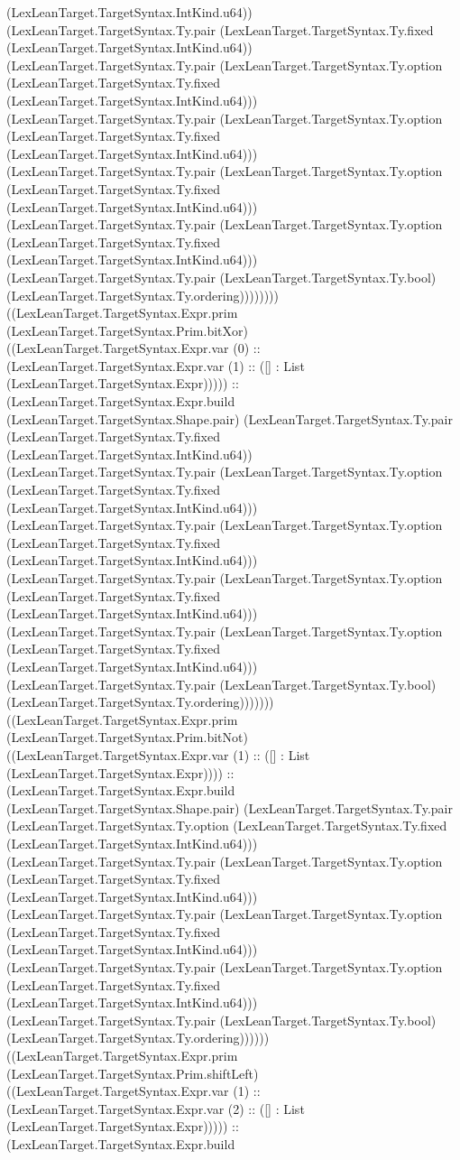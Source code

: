 \documentclass[11pt]{article}
\begin{document}
(LexLeanTarget.TargetSyntax.IntKind.u64)) (LexLeanTarget.TargetSyntax.Ty.pair (LexLeanTarget.TargetSyntax.Ty.fixed (LexLeanTarget.TargetSyntax.IntKind.u64)) (LexLeanTarget.TargetSyntax.Ty.pair (LexLeanTarget.TargetSyntax.Ty.option (LexLeanTarget.TargetSyntax.Ty.fixed (LexLeanTarget.TargetSyntax.IntKind.u64))) (LexLeanTarget.TargetSyntax.Ty.pair (LexLeanTarget.TargetSyntax.Ty.option (LexLeanTarget.TargetSyntax.Ty.fixed (LexLeanTarget.TargetSyntax.IntKind.u64))) (LexLeanTarget.TargetSyntax.Ty.pair (LexLeanTarget.TargetSyntax.Ty.option (LexLeanTarget.TargetSyntax.Ty.fixed (LexLeanTarget.TargetSyntax.IntKind.u64))) (LexLeanTarget.TargetSyntax.Ty.pair (LexLeanTarget.TargetSyntax.Ty.option (LexLeanTarget.TargetSyntax.Ty.fixed (LexLeanTarget.TargetSyntax.IntKind.u64))) (LexLeanTarget.TargetSyntax.Ty.pair (LexLeanTarget.TargetSyntax.Ty.bool) (LexLeanTarget.TargetSyntax.Ty.ordering)))))))) ((LexLeanTarget.TargetSyntax.Expr.prim (LexLeanTarget.TargetSyntax.Prim.bitXor) ((LexLeanTarget.TargetSyntax.Expr.var (0) :: (LexLeanTarget.TargetSyntax.Expr.var (1) :: ([] : List (LexLeanTarget.TargetSyntax.Expr))))) :: (LexLeanTarget.TargetSyntax.Expr.build (LexLeanTarget.TargetSyntax.Shape.pair) (LexLeanTarget.TargetSyntax.Ty.pair (LexLeanTarget.TargetSyntax.Ty.fixed (LexLeanTarget.TargetSyntax.IntKind.u64)) (LexLeanTarget.TargetSyntax.Ty.pair (LexLeanTarget.TargetSyntax.Ty.option (LexLeanTarget.TargetSyntax.Ty.fixed (LexLeanTarget.TargetSyntax.IntKind.u64))) (LexLeanTarget.TargetSyntax.Ty.pair (LexLeanTarget.TargetSyntax.Ty.option (LexLeanTarget.TargetSyntax.Ty.fixed (LexLeanTarget.TargetSyntax.IntKind.u64))) (LexLeanTarget.TargetSyntax.Ty.pair (LexLeanTarget.TargetSyntax.Ty.option (LexLeanTarget.TargetSyntax.Ty.fixed (LexLeanTarget.TargetSyntax.IntKind.u64))) (LexLeanTarget.TargetSyntax.Ty.pair (LexLeanTarget.TargetSyntax.Ty.option (LexLeanTarget.TargetSyntax.Ty.fixed (LexLeanTarget.TargetSyntax.IntKind.u64))) (LexLeanTarget.TargetSyntax.Ty.pair (LexLeanTarget.TargetSyntax.Ty.bool) (LexLeanTarget.TargetSyntax.Ty.ordering))))))) ((LexLeanTarget.TargetSyntax.Expr.prim (LexLeanTarget.TargetSyntax.Prim.bitNot) ((LexLeanTarget.TargetSyntax.Expr.var (1) :: ([] : List (LexLeanTarget.TargetSyntax.Expr)))) :: (LexLeanTarget.TargetSyntax.Expr.build (LexLeanTarget.TargetSyntax.Shape.pair) (LexLeanTarget.TargetSyntax.Ty.pair (LexLeanTarget.TargetSyntax.Ty.option (LexLeanTarget.TargetSyntax.Ty.fixed (LexLeanTarget.TargetSyntax.IntKind.u64))) (LexLeanTarget.TargetSyntax.Ty.pair (LexLeanTarget.TargetSyntax.Ty.option (LexLeanTarget.TargetSyntax.Ty.fixed (LexLeanTarget.TargetSyntax.IntKind.u64))) (LexLeanTarget.TargetSyntax.Ty.pair (LexLeanTarget.TargetSyntax.Ty.option (LexLeanTarget.TargetSyntax.Ty.fixed (LexLeanTarget.TargetSyntax.IntKind.u64))) (LexLeanTarget.TargetSyntax.Ty.pair (LexLeanTarget.TargetSyntax.Ty.option (LexLeanTarget.TargetSyntax.Ty.fixed (LexLeanTarget.TargetSyntax.IntKind.u64))) (LexLeanTarget.TargetSyntax.Ty.pair (LexLeanTarget.TargetSyntax.Ty.bool) (LexLeanTarget.TargetSyntax.Ty.ordering)))))) ((LexLeanTarget.TargetSyntax.Expr.prim (LexLeanTarget.TargetSyntax.Prim.shiftLeft) ((LexLeanTarget.TargetSyntax.Expr.var (1) :: (LexLeanTarget.TargetSyntax.Expr.var (2) :: ([] : List (LexLeanTarget.TargetSyntax.Expr))))) :: (LexLeanTarget.TargetSyntax.Expr.build 
\end{document}
